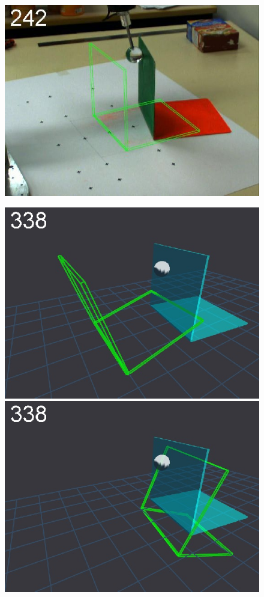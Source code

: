 \begin{figure}[tb]
{\includegraphics[width=\imgBXwid]{./B2_LWPR1_58_4}
}
\centerline{
\includegraphics[width=\imgBXwid]{./B1_1exp_20_5}
\includegraphics[width=\imgBXwid]{./B1_2exp_20_5}
}
\end{figure}
